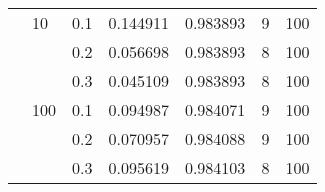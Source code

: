 \begin{table}[H]
\begin{tabular}{lllrrrr}
       & 10  & 0.1 &  0.144911 &  0.983893 &       9 &   100 \\
       &     & 0.2 &  0.056698 &  0.983893 &       8 &   100 \\
       &     & 0.3 &  0.045109 &  0.983893 &       8 &   100 \\
       & 100 & 0.1 &  0.094987 &  0.984071 &       9 &   100 \\
       &     & 0.2 &  0.070957 &  0.984088 &       9 &   100 \\
       &     & 0.3 &  0.095619 &  0.984103 &       8 &   100 \\
\bottomrule
\end{tabular}
\end{table}
